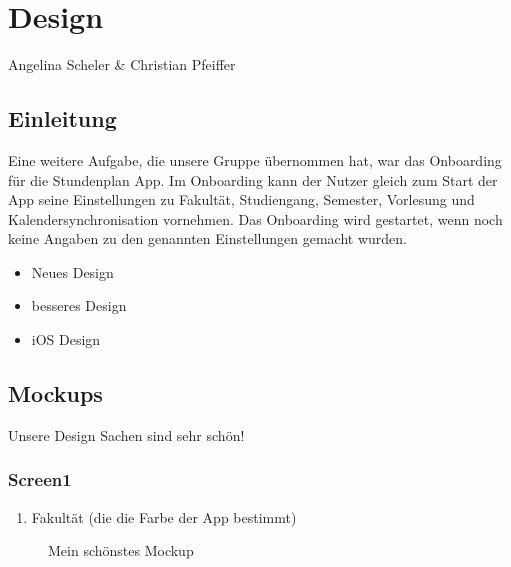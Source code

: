 \chapter{Design}
Angelina Scheler \& Christian Pfeiffer

\section{Einleitung}
Eine weitere Aufgabe, die unsere Gruppe übernommen hat, war das Onboarding für die Stundenplan App. Im Onboarding kann der Nutzer gleich zum Start der App seine Einstellungen zu Fakultät, Studiengang, Semester, Vorlesung und Kalendersynchronisation vornehmen. Das Onboarding wird gestartet, wenn noch keine Angaben zu den genannten Einstellungen gemacht wurden.

\begin{itemize}
\item Neues Design
\item besseres Design
\item iOS Design
\end{itemize}


\section{Mockups}
Unsere Design Sachen sind sehr schön!
\subsection{Screen1}
\begin{enumerate}
\item Fakultät (die die Farbe der App bestimmt)
\end{enumerate}

\begin{figure}[ht]
	\centering
	\caption{Mein schönstes Mockup}
	\label{fig1}
\end{figure}